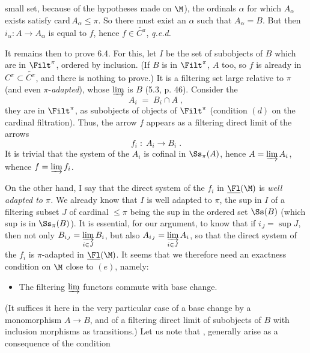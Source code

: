 
small set, because of the hypotheses made on $\M$), the ordinals $\alpha$ for which $A_\alpha$ exists satisfy $\mathrm{card}\,A_\alpha \leq \pi$. So there must exist an $\alpha$ such that $A_\alpha = B$. But then $i_\alpha : A \longrightarrow A_\alpha$ is equal to $f$, hence $f \in \widetilde{C^{\pi}}$, \quad \textit{q.e.d.}

It remains then to prove 6.4. For this, let $I$ be the set of subobjects of $B$ which are in $\Filt^{\pi}$, ordered by inclusion. (If $B$ is in $\Filt^{\pi}$, $A$ too, so $f$ is already in $C^{\pi} \subset \widetilde{C^{\pi}}$, and there is nothing to prove.) It is a filtering set large relative to $\pi$ (and even $\pi$-\textit{adapted}), whose $\varinjlim$ is $B$ (5.3, p. 46). Consider the
\[
A_i \;=\; B_i \cap A \;,
\]
they are in $\Filt^{\pi}$, as subobjects of objects of $\Filt^{\pi}$ (condition $(d)$ on the cardinal filtration). Thus, the arrow $f$ appears as a filtering direct limit of the arrows
\[
f_i \;:\; A_i \longrightarrow B_i \;.
\]
It is trivial that the system of the $A_i$ is cofinal in $\Ss_{\pi}(A)$, hence $A = \varinjlim A_i$, whence $f = \varinjlim f_i$.

On the other hand, I say that the direct system of the $f_i$ in $\underline{\Fl}(\M)$ is \textit{well adapted to $\pi$.} We already know that $I$ is well adapted to $\pi$, the sup in $I$ of a filtering subset $J$ of cardinal $\leq \pi$ being the sup in the ordered set $\Ss(B)$ (which sup is in $\Ss_{\pi}(B)$). It is essential, for our argument, to know that if $i_J = \sup J$, then not only $B_{i_J} = \varinjlim\limits_{i\in J} B_i$, but \marginpar{$\|$}%
also $A_{i_J} = \varinjlim\limits_{i\in J} A_i$, so that the direct system of the $f_i$ is $\pi$-adapted in $\underline{\Fl}(\M)$. It seems that we therefore need an exactness condition on $\M$ close to $(e)$, namely:

\begin{itemize}
\item[\cercle{e$'$}] The filtering $\varinjlim$ functors commute with base change.
\end{itemize}

(It suffices it here in the very particular case of a base change by a monomorphism $A \longrightarrow B$, and of a filtering direct limit of subobjects of $B$ with inclusion morphisms as transitions.) Let us note that ,  generally arise as a consequence of the condition %

